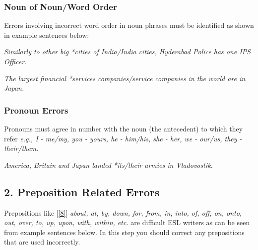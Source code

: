 \documentclass[12pt]{article}
\begin{document}





\subsubsection{Noun of Noun/Word Order}
Errors involving incorrect word order in noun phrases must be identified as shown in example sentences below:

{\it Similarly to other big *cities of India/India cities, Hyderabad Police has one IPS Officer.}

{\it The largest financial *services companies/service companies in the world are in Japan.}


\subsubsection{Pronoun Errors}
Pronouns must agree in number with the noun (the antecedent) to which they refer {\it e.g., I - me/my, you - yours, he - him/his, she - her, we - our/us, they - their/them}.

{\it America, Britain and Japan landed *its/their armies in Vladovostik.}
 




\subsection{2. Preposition Related Errors}
Prepositions like [\ref{8}] {\it about, at, by, down, for, from, in, into, of, off, on, onto, out, over, to, up, upon, with, within, etc.} are difficult ESL writers as can be seen from example sentences below. In this step you should correct any prepositions that are used incorrectly. 
\end{document}
